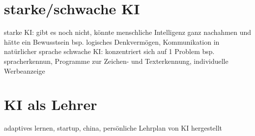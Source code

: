 \section {starke/schwache KI}
starke KI: gibt es noch nicht, könnte menschliche Intelligenz ganz nachahmen und hätte ein Bewusstsein bsp. logisches Denkvermögen, 
Kommunikation in natürlicher sprache
schwache KI: konzentriert sich auf 1 Problem bsp. spracherkennun, Programme zur Zeichen- und Texterkennung,
individuelle Werbeanzeige

\section {KI als Lehrer}
adaptives lernen, startup, china, persönliche Lehrplan von KI hergestellt

